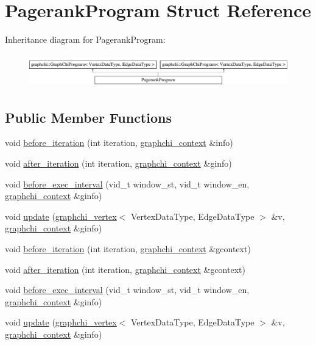 \hypertarget{struct_pagerank_program}{\section{Pagerank\-Program Struct Reference}
\label{struct_pagerank_program}
}
Inheritance diagram for Pagerank\-Program\-:\begin{figure}[H]
\begin{center}
\leavevmode
\includegraphics[height=1.454545cm]{struct_pagerank_program}
\end{center}
\end{figure}
\subsection*{Public Member Functions}
\begin{DoxyCompactItemize}
\item 
void \hyperlink{struct_pagerank_program_a24985cb94a2405111cd4f06b747c9c9a}{before\-\_\-iteration} (int iteration, \hyperlink{structgraphchi_1_1graphchi__context}{graphchi\-\_\-context} \&info)
\item 
void \hyperlink{struct_pagerank_program_a372d4640eb60ccbf512eafa0db284597}{after\-\_\-iteration} (int iteration, \hyperlink{structgraphchi_1_1graphchi__context}{graphchi\-\_\-context} \&ginfo)
\item 
void \hyperlink{struct_pagerank_program_abc0abfe9be0c903925e02d0a50eeb3b0}{before\-\_\-exec\-\_\-interval} (vid\-\_\-t window\-\_\-st, vid\-\_\-t window\-\_\-en, \hyperlink{structgraphchi_1_1graphchi__context}{graphchi\-\_\-context} \&ginfo)
\item 
void \hyperlink{struct_pagerank_program_a0124e454f3b242b5d29a217f3427c84b}{update} (\hyperlink{classgraphchi_1_1graphchi__vertex}{graphchi\-\_\-vertex}$<$ Vertex\-Data\-Type, Edge\-Data\-Type $>$ \&v, \hyperlink{structgraphchi_1_1graphchi__context}{graphchi\-\_\-context} \&ginfo)
\item 
void \hyperlink{struct_pagerank_program_a7b9dc8efce8e7c09bc83c2c3a25d1935}{before\-\_\-iteration} (int iteration, \hyperlink{structgraphchi_1_1graphchi__context}{graphchi\-\_\-context} \&gcontext)
\item 
void \hyperlink{struct_pagerank_program_a0d99d6408cac5f713ccd6f999b14f5ab}{after\-\_\-iteration} (int iteration, \hyperlink{structgraphchi_1_1graphchi__context}{graphchi\-\_\-context} \&gcontext)
\item 
void \hyperlink{struct_pagerank_program_abc0abfe9be0c903925e02d0a50eeb3b0}{before\-\_\-exec\-\_\-interval} (vid\-\_\-t window\-\_\-st, vid\-\_\-t window\-\_\-en, \hyperlink{structgraphchi_1_1graphchi__context}{graphchi\-\_\-context} \&ginfo)
\item 
void \hyperlink{struct_pagerank_program_a0124e454f3b242b5d29a217f3427c84b}{update} (\hyperlink{classgraphchi_1_1graphchi__vertex}{graphchi\-\_\-vertex}$<$ Vertex\-Data\-Type, Edge\-Data\-Type $>$ \&v, \hyperlink{structgraphchi_1_1graphchi__context}{graphchi\-\_\-context} \&ginfo)
\end{DoxyCompactItemize}
